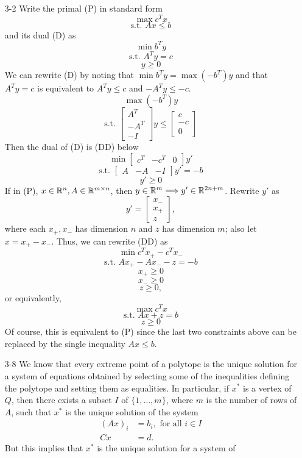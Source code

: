 \documentclass[12pt]{article}
\begin{document}
\begin{enumerate}
\item[3-2]   %
Write the primal (P) in standard form
$$\max c^Tx$$
$$\textrm{s.t. }Ax\leq b$$
and its dual (D) as
$$\min b^Ty$$
$$\textrm{s.t. }A^Ty = c$$
$$y\geq 0$$
We can rewrite (D) by noting that $\min b^Ty = \max (-b^T)y$
and that $A^Ty = c$ is equivalent to $A^Ty \leq c$ and $-A^Ty \leq -c$.
$$\max(-b^T)y$$
$$\textrm{s.t. }
\begin{bmatrix}
A^T \\
-A^T\\
-I
\end{bmatrix}
y \leq
\begin{bmatrix}
c \\
-c\\
0
\end{bmatrix}
$$
Then the dual of (D) is (DD) below
$$\min \begin{bmatrix}
c^T & -c^T & 0
\end{bmatrix}y'$$
$$\textrm{s.t. }
\begin{bmatrix}
A & -A & -I
\end{bmatrix}
y' = -b$$
$$y'\geq 0$$
If in (P), $x\in{\mathbb R}^n, A\in{\mathbb R}^{m\times n}$, then $y\in{\mathbb R}^m \Longrightarrow y'\in{\mathbb R}^{2n+m}$.
Rewrite $y'$ as
$$y' = \begin{bmatrix}
x_{-} \\
x_{+}\\
z
\end{bmatrix},$$
where each $x_+, x_-$ has dimension $n$ and $z$ has dimension $m$; also let $x = x_+ - x_-$.
Thus, we can rewrite (DD) as
$$\min c^Tx_+ - c^Tx_-$$
$$\textrm{s.t. }Ax_+ - Ax_- - z = -b$$
$$x_+\geq 0$$
$$x_-\geq 0$$
$$z\geq 0,$$
or equivalently,
$$\max c^Tx$$
$$\textrm{s.t. }Ax + z = b$$
$$z\geq 0$$
Of course, this is equivalent to (P) since the last two constraints above
can be replaced by the single inequality $Ax \leq b$.
\iffalse
\item[3-8]
We know that every extreme point of a polytope is
  the unique solution for a system of equations obtained by selecting
  some of the inequalities defining the polytope and setting them as
  equalities. In particular, if $x^*$ is a vertex of $Q$, then there
  exists a subset $I$ of $\{1,\dots,m\}$, where $m$ is the number of
  rows of $A$, such that $x^*$ is the unique solution of the system
\begin{align*}
(Ax)_i &= b_i, \text{ for all $i \in I$}\\
Cx &= d.
\end{align*}
But this implies that $x^*$ is the unique solution for a system of

\end{enumerate}
\end{document}
